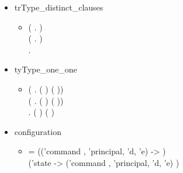 \begin{itemize}
    \item trType_distinct_clauses
  \begin{itemize}
    \item[] \HOLTokenTurnstile{} (\HOLSymConst{\HOLTokenForall{}} .   \HOLSymConst{\HOLTokenNotEqual{}}  ) \HOLSymConst{\HOLTokenConj{}}\\ (\HOLSymConst{\HOLTokenForall{}} .   \HOLSymConst{\HOLTokenNotEqual{}}  ) \HOLSymConst{\HOLTokenConj{}}\\
   \HOLSymConst{\HOLTokenForall{}} .   \HOLSymConst{\HOLTokenNotEqual{}}  
 \end{itemize}
 \item tyType_one_one
  \begin{itemize}
    \item[] \HOLTokenTurnstile{} (\HOLSymConst{\HOLTokenForall{}} . (  \HOLSymConst{=}  ) \HOLSymConst{\HOLTokenEquiv{}} ( \HOLSymConst{=} )) \HOLSymConst{\HOLTokenConj{}}\\
   (\HOLSymConst{\HOLTokenForall{}} . (  \HOLSymConst{=}  ) \HOLSymConst{\HOLTokenEquiv{}} ( \HOLSymConst{=} )) \HOLSymConst{\HOLTokenConj{}}\\
   \HOLSymConst{\HOLTokenForall{}} . (  \HOLSymConst{=}  ) \HOLSymConst{\HOLTokenEquiv{}} ( \HOLSymConst{=} )
 \end{itemize}
 \item configuration
  \begin{itemize}
    \item[]  =
     (('command , 'principal, 'd, 'e)  -> )\\
        ('state -> ('command , 'principal, 'd, 'e) )\\

\end{itemize}
\end{itemize}
